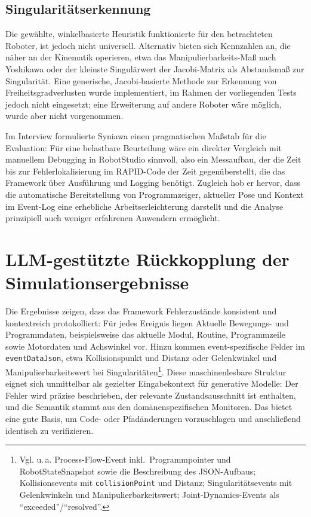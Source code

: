{  \subsection{Singularitätserkennung}

  Die gewählte, winkelbasierte Heuristik funktionierte für den betrachteten
  Roboter, ist jedoch nicht universell. Alternativ bieten sich
  Kennzahlen an, die
  näher an der Kinematik operieren, etwa das Manipulierbarkeits-Maß
  nach Yoshikawa oder
  der kleinste Singulärwert der Jacobi-Matrix als Abstandsmaß zur Singularität.
  Eine generische, Jacobi-basierte Methode zur Erkennung von
  Freiheitsgradverlusten wurde implementiert, im Rahmen der vorliegenden Tests
  jedoch nicht eingesetzt; eine Erweiterung auf andere Roboter wäre
  möglich, wurde
  aber nicht vorgenommen.

  Im Interview formulierte Syniawa einen pragmatischen Maßstab für
  die Evaluation:
  Für eine belastbare Beurteilung wäre ein direkter Vergleich mit manuellem
  Debugging in RobotStudio sinnvoll, also ein Messaufbau, der die Zeit bis zur
  Fehlerlokalisierung im RAPID-Code der Zeit gegenüberstellt, die das Framework
  über Ausführung und Logging benötigt. Zugleich hob er hervor, dass die
  automatische Bereitstellung von Programmzeiger, aktueller Pose und Kontext im
  Event-Log eine erhebliche Arbeitserleichterung darstellt und die Analyse
  prinzipiell auch weniger erfahrenen Anwendern ermöglicht.

  \section{LLM-gestützte Rückkopplung der Simulationsergebnisse}

  Die Ergebnisse zeigen, dass das Framework Fehlerzustände konsistent
  und kontextreich protokolliert: Für jedes Ereignis liegen
  Aktuelle Bewegungs- und Programmdaten, beispielsweise das aktuelle
  Modul, Routine,
  Programmzeile sowie Motordaten und Achswinkel vor. Hinzu kommen
  event-spezifische Felder im \texttt{eventDataJson}, etwa
  Kollisionspunkt und Distanz oder Gelenkwinkel und
  Manipulierbarkeitswert bei Singularitäten\footnote{Vgl. u.\,a.
    Process-Flow-Event inkl.\ Programmpointer und RobotStateSnapshot
    sowie die Beschreibung des JSON-Aufbaus; Kollisionsevents mit
    \texttt{collisionPoint} und Distanz; Singularitätsevents mit
    Gelenkwinkeln und Manipulierbarkeitswert; Joint-Dynamics-Events als
  \enquote{exceeded}/\enquote{resolved}.}. Diese maschinenlesbare
  Struktur eignet sich unmittelbar als gezielter Eingabekontext für
  generative Modelle: Der Fehler wird präzise beschrieben, der
  relevante Zustandsausschnitt ist enthalten, und die Semantik stammt
  aus den domänenspezifischen Monitoren. Das bietet eine gute Basis, um Code-
  oder Pfadänderungen vorzuschlagen und anschließend identisch zu
  verifizieren.

}
